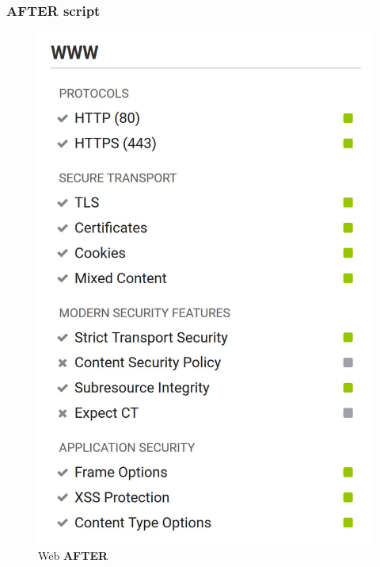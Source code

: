 \subsubsection{AFTER script}
\begin{figure}[H]
	\centering
	\includegraphics[width=0.75\linewidth]{pics/hardenize_web_after}
	\caption{Web \textbf{AFTER}}
	\label{fig:afterWeb}
\end{figure}
